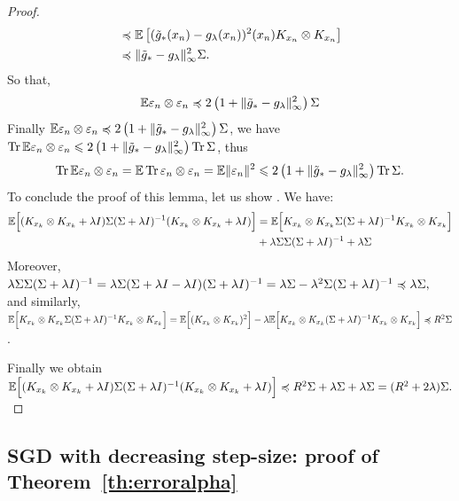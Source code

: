 \begin{proof}
\begin{align*}
&\preccurlyeq {\mathbb E} \left[ (\tilde{g}_*(x_n)- g_\lambda(x_n))^2(x_n) K_{x_n} \otimes K_{x_n} \right] \\
&\preccurlyeq \|\tilde{g}_*- g_\lambda\|^2_\infty \Sigma.
\end{align*}
So that, 
$$  
{\mathbb E} \varepsilon_n \otimes \varepsilon_n \preccurlyeq 2 \left(1+\|\tilde{g}_*- g_\lambda\|^2_\infty\right) \Sigma
$$
%
Finally ${\mathbb E} \varepsilon_n \otimes \varepsilon_n \preccurlyeq 2 \left(1+\|\tilde{g}_*- g_\lambda\|^2_\infty\right) \Sigma$, we have $\operatorname{Tr} {\mathbb E} \varepsilon_n \otimes \varepsilon_n \leqslant 2 \left(1+\|\tilde{g}_*- g_\lambda\|^2_\infty\right) \operatorname{Tr} \Sigma$, thus $$\operatorname{Tr} {\mathbb E} \varepsilon_n \otimes \varepsilon_n = {\mathbb E} \operatorname{Tr} \varepsilon_n \otimes \varepsilon_n = {\mathbb E} \|\varepsilon_n\|^2 \leqslant 2 \left(1+\|\tilde{g}_*- g_\lambda\|^2_\infty\right) \operatorname{Tr} \Sigma.$$
%
To conclude the proof of this lemma, let us show .
%
We have: 
\begin{align*}
{\mathbb E} \Big[ ( K_{x_k} \otimes K_{x_k} + \lambda I )  \Sigma ( \Sigma + \lambda I)^{-1} ( K_{x_k} \otimes K_{x_k} + \lambda I ) \Big] &= {\mathbb E} \Big[  K_{x_k} \otimes K_{x_k}  \Sigma ( \Sigma + \lambda I)^{-1} K_{x_k} \otimes K_{x_k}  \Big] \\ &+ \lambda  \Sigma \Sigma ( \Sigma + \lambda I)^{-1}+\lambda \Sigma 
\end{align*}
Moreover, $\lambda  \Sigma \Sigma ( \Sigma + \lambda I)^{-1} = \lambda  \Sigma (\Sigma + \lambda I - \lambda I) ( \Sigma + \lambda I)^{-1} = \lambda \Sigma - \lambda^2 \Sigma( \Sigma + \lambda I)^{-1} \preccurlyeq \lambda \Sigma,  $ and similarly, ${\mathbb E} \Big[  K_{x_k} \otimes K_{x_k}  \Sigma ( \Sigma + \lambda I)^{-1} K_{x_k} \otimes K_{x_k}  \Big] = {\mathbb E} \Big[  (K_{x_k} \otimes K_{x_k} )^2 \Big] - \lambda {\mathbb E} \Big[  K_{x_k} \otimes K_{x_k} ( \Sigma + \lambda I)^{-1} K_{x_k} \otimes K_{x_k}  \Big] \preccurlyeq R^2 \Sigma$.

Finally we obtain $ {\mathbb E} \Big[ ( K_{x_k} \otimes K_{x_k} + \lambda I )  \Sigma ( \Sigma + \lambda I)^{-1} ( K_{x_k} \otimes K_{x_k} + \lambda I ) \Big] \preccurlyeq R^2 \Sigma + \lambda \Sigma + \lambda \Sigma = (R^2 + 2 \lambda) \Sigma.$ 

\end{proof}

\subsection{SGD with decreasing step-size: proof of Theorem~\ref{th:erroralpha}}
\label{ap:EXPalpha}

